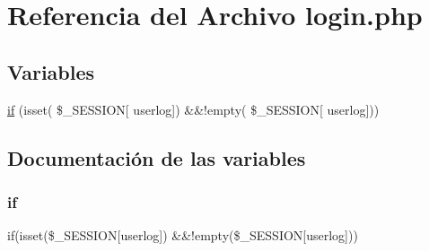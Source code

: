 \hypertarget{login_8php}{}\section{Referencia del Archivo login.\+php}
\label{login_8php}
\subsection*{Variables}
\begin{DoxyCompactItemize}
\item 
\mbox{\hyperlink{login_8php_aefb5893336d7ead40ae915367f4b82cc}{if}} (isset( \$\+\_\+\+S\+E\+S\+S\+I\+ON\mbox{[} \textquotesingle{}userlog\textquotesingle{}\mbox{]}) \&\&!empty( \$\+\_\+\+S\+E\+S\+S\+I\+ON\mbox{[} \textquotesingle{}userlog\textquotesingle{}\mbox{]}))
\end{DoxyCompactItemize}


\subsection{Documentación de las variables}
\mbox{\label{login_8php_aefb5893336d7ead40ae915367f4b82cc}} 
\subsubsection{\texorpdfstring{if}{if}}
{\footnotesize\ttfamily if(isset(\$\+\_\+\+S\+E\+S\+S\+I\+ON\mbox{[}\textquotesingle{}userlog\textquotesingle{}\mbox{]}) \&\&!empty(\$\+\_\+\+S\+E\+S\+S\+I\+ON\mbox{[}\textquotesingle{}userlog\textquotesingle{}\mbox{]}))}

